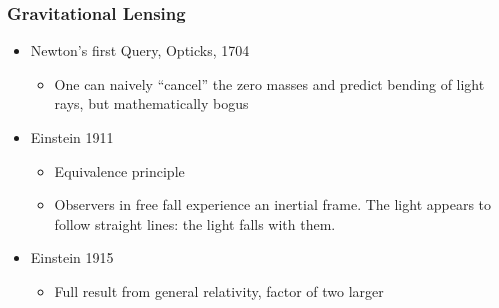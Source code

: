 \documentclass{beamer}
\begin{document}
\frame
{
    \frametitle{Gravitational Lensing}

 
    \begin{itemize}

        \item Newton's first Query, Opticks, 1704
            \begin{itemize}
                \item One can naively ``cancel'' the zero masses and predict
                    bending of light rays, but mathematically bogus
            \end{itemize}

        \item Einstein 1911
            \begin{itemize}

                \item Equivalence principle

                \item Observers in free fall experience an inertial frame.  The
                    light appears to follow straight lines: the light falls
                    with them.

            \end{itemize}

        \item Einstein 1915
            \begin{itemize}
                \item Full result from general relativity, factor of two larger
            \end{itemize}


    \end{itemize}

}


	
\end{document}
